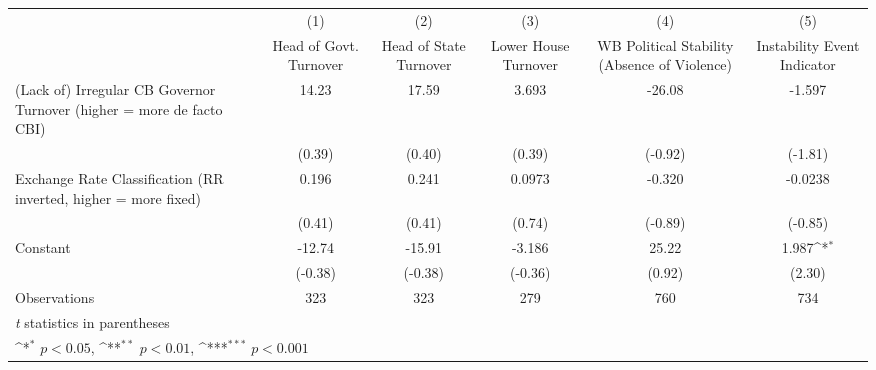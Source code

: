 {
\def\sym#1{\ifmmode^{#1}\else\(^{#1}\)\fi}
\begin{tabular}{l*{5}{c}}
\hline\hline
                &\multicolumn{1}{c}{(1)}&\multicolumn{1}{c}{(2)}&\multicolumn{1}{c}{(3)}&\multicolumn{1}{c}{(4)}&\multicolumn{1}{c}{(5)}\\
                &\multicolumn{1}{c}{Head of Govt. Turnover}&\multicolumn{1}{c}{Head of State Turnover}&\multicolumn{1}{c}{Lower House Turnover}&\multicolumn{1}{c}{WB Political Stability (Absence of Violence)}&\multicolumn{1}{c}{Instability Event Indicator}\\
\hline
(Lack of) Irregular CB Governor Turnover (higher = more de facto CBI)&    14.23         &    17.59         &    3.693         &   -26.08         &   -1.597         \\
                &   (0.39)         &   (0.40)         &   (0.39)         &  (-0.92)         &  (-1.81)         \\
[1em]
Exchange Rate Classification (RR inverted, higher = more fixed)&    0.196         &    0.241         &   0.0973         &   -0.320         &  -0.0238         \\
                &   (0.41)         &   (0.41)         &   (0.74)         &  (-0.89)         &  (-0.85)         \\
[1em]
Constant        &   -12.74         &   -15.91         &   -3.186         &    25.22         &    1.987\sym{*}  \\
                &  (-0.38)         &  (-0.38)         &  (-0.36)         &   (0.92)         &   (2.30)         \\
\hline
Observations    &      323         &      323         &      279         &      760         &      734         \\
\hline\hline
\multicolumn{6}{l}{\footnotesize \textit{t} statistics in parentheses}\\
\multicolumn{6}{l}{\footnotesize \sym{*} \(p<0.05\), \sym{**} \(p<0.01\), \sym{***} \(p<0.001\)}\\
\end{tabular}
}
